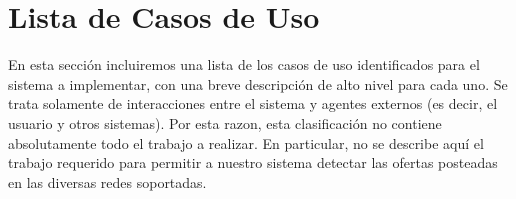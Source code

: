 \section*{Lista de Casos de Uso}
 En esta sección incluiremos una lista de los casos de uso identificados para el sistema a implementar, con una breve descripción de alto nivel para cada uno. Se trata solamente de interacciones entre el sistema y agentes externos (es decir, el usuario y otros sistemas). Por esta razon, esta clasificación no contiene absolutamente todo el trabajo a realizar.  
    En particular, no se describe aquí el trabajo requerido para permitir a nuestro sistema detectar las ofertas posteadas en las diversas redes soportadas. 

